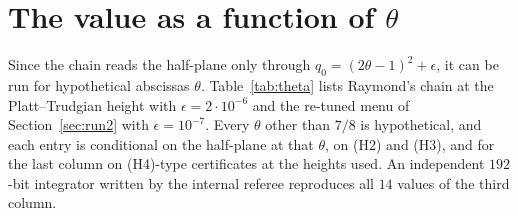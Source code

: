 \documentclass[11pt]{article}
\theoremstyle{definition}
\begin{document}
\section{The value as a function of \texorpdfstring{$\theta$}{theta}}\label{sec:theta}

Since the chain reads the half-plane only through $q_0=(2\theta-1)^2+\epsilon$, it can be run
for hypothetical abscissas $\theta$. Table~\ref{tab:theta} lists Raymond's chain at the
Platt--Trudgian height with $\epsilon=2\cdot10^{-6}$ and the re-tuned menu of
Section~\ref{sec:run2} with $\epsilon=10^{-7}$. Every $\theta$ other than $7/8$ is
hypothetical, and each entry is conditional on the half-plane at that $\theta$, on (H2) and
(H3), and for the last column on (H4)-type certificates at the heights used. An independent
$192$-bit integrator written by the internal referee reproduces all $14$ values of the third
column.
\end{document}
